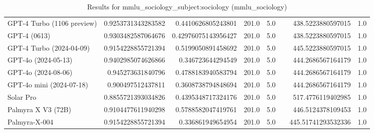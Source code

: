 \begin{table}[htp]
{\begin{tabular}{lrrrrrrr}
GPT-4 Turbo (1106 preview) & 0.9253731343283582 & 0.4410626805243801 & 201.0 & 5.0 &  & 438.5223880597015 & 1.0 \\
GPT-4 (0613) & 0.9303482587064676 & 0.42976075143956427 & 201.0 & 5.0 &  & 438.5223880597015 & 1.0 \\
GPT-4 Turbo (2024-04-09) & 0.9154228855721394 & 0.5199050891458692 & 201.0 & 5.0 &  & 445.5223880597015 & 1.0 \\
GPT-4o (2024-05-13) & 0.9402985074626866 & 0.346723644294549 & 201.0 & 5.0 &  & 444.2686567164179 & 1.0 \\
GPT-4o (2024-08-06) & 0.945273631840796 & 0.4788183940583794 & 201.0 & 5.0 &  & 444.2686567164179 & 1.0 \\
GPT-4o mini (2024-07-18) & 0.900497512437811 & 0.3608738794848694 & 201.0 & 5.0 &  & 444.2686567164179 & 1.0 \\
Solar Pro & 0.8855721393034826 & 0.4395348717324176 & 201.0 & 5.0 &  & 517.4776119402985 & 1.0 \\
Palmyra X V3 (72B) & 0.9104477611940298 & 0.5788582047419761 & 201.0 & 5.0 &  & 446.5124378109453 & 1.0 \\
Palmyra-X-004 & 0.9154228855721394 & 0.336861949654954 & 201.0 & 5.0 &  & 445.51741293532336 & 1.0 \\
\bottomrule
\end{tabular}}
\caption{Results for mmlu_sociology_subject:sociology (mmlu_sociology)}
\label{fig:mmlu_sociology_subject:sociology (mmlu_sociology)}
\end{table}